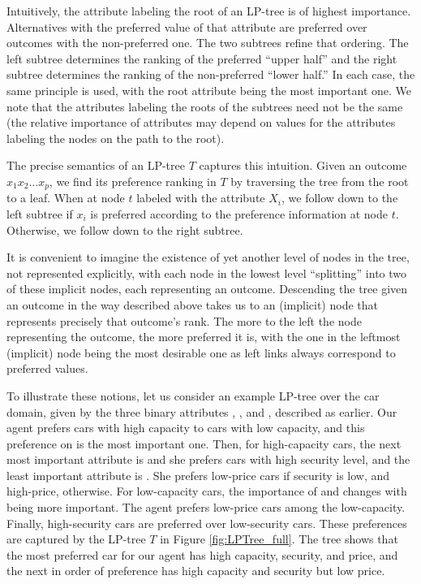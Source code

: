 Intuitively, the attribute labeling the root of an LP-tree is of highest 
importance. Alternatives with the preferred value of that attribute
are preferred over outcomes with the non-preferred one. The two
subtrees refine that ordering. The left subtree determines the ranking
of the preferred ``upper half'' and the right subtree determines the 
ranking of the non-preferred ``lower half.'' In each case, the same 
principle is used, with the root attribute being the most important one. 
We note that the attributes labeling the roots of the 
subtrees need not be the same (the relative importance of attributes may 
depend on values for the attributes labeling the nodes on the path to the root).

The precise semantics of an LP-tree $T$ captures this intuition. Given 
an outcome $x_1x_2\ldots x_p$, we find its preference ranking in 
$T$ by traversing the tree from the root to a leaf. When at node $t$ 
labeled with the attribute $X_i$, we follow down to the left subtree if
$x_i$ is preferred according to the preference information at node
$t$. Otherwise, we follow down to the right subtree. 

It is convenient to imagine the existence of yet another level of nodes 
in the tree, not represented explicitly, with each node in the lowest 
level ``splitting'' into two of these
implicit nodes, each representing an outcome. Descending the tree 
given an outcome in the way described above takes us to an (implicit) 
node that represents precisely that outcome's rank.
The more to the left the node representing the outcome, the more 
preferred it is, with the one in the leftmost (implicit) node being the 
most desirable one as left links always correspond to preferred values.

To illustrate these notions, let us consider an example LP-tree
over the car domain, given by the three binary attributes 
, , and ,
described as earlier.
Our agent prefers cars with high capacity to cars with low capacity,
and this preference on  is the most important one.
Then, for high-capacity cars, the next most important attribute is
 and she prefers cars with high security level,
and the least important attribute is .
She prefers low-price cars if security is low, and high-price, otherwise.
For low-capacity cars, the importance of 
and  changes with  being more important.
The agent prefers low-price cars among the low-capacity.
Finally, high-security cars are preferred over low-security cars.
These preferences are captured by 
the LP-tree $T$ in Figure \ref{fig:LPTree_full}. The tree shows that
the most preferred car for our agent has high capacity, security,
and price, and the next in order of preference has high capacity
and security but low price.

